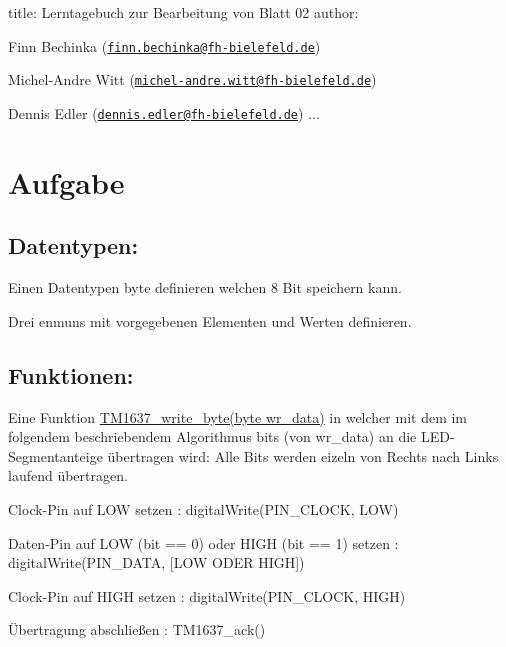 

 title\+: \textquotesingle{}Lerntagebuch zur Bearbeitung von Blatt 02\textquotesingle{} author\+:
\begin{DoxyItemize}
\item Finn Bechinka (\href{mailto:finn.bechinka@fh-bielefeld.de}{\tt finn.\+bechinka@fh-\/bielefeld.\+de})
\item Michel-\/\+Andre Witt (\href{mailto:michel-andre.witt@fh-bielefeld.de}{\tt michel-\/andre.\+witt@fh-\/bielefeld.\+de})
\item Dennis Edler (\href{mailto:dennis.edler@fh-bielefeld.de}{\tt dennis.\+edler@fh-\/bielefeld.\+de}) ...
\end{DoxyItemize}\hypertarget{md_lerntagebuch_autotoc_md0}{}\section{Aufgabe}\label{md_lerntagebuch_autotoc_md0}
\hypertarget{md_lerntagebuch_autotoc_md1}{}\subsection{Datentypen\+:}\label{md_lerntagebuch_autotoc_md1}

\begin{DoxyEnumerate}
\item Einen Datentypen byte definieren welchen 8 Bit speichern kann.
\item Drei enmuns mit vorgegebenen Elementen und Werten definieren.
\end{DoxyEnumerate}\hypertarget{md_lerntagebuch_autotoc_md2}{}\subsection{Funktionen\+:}\label{md_lerntagebuch_autotoc_md2}
Eine Funktion {\ttfamily \hyperlink{segmentanzeige_8c_a09f1e0171b38b9abbb5d351364cfec71}{T\+M1637\+\_\+write\+\_\+byte(byte wr\+\_\+data)}} in welcher mit dem im folgendem beschriebendem Algorithmus bits (von wr\+\_\+data) an die L\+E\+D-\/\+Segmentanteige übertragen wird\+: Alle Bits werden eizeln von Rechts nach Links laufend übertragen.


\begin{DoxyEnumerate}
\item Clock-\/\+Pin auf L\+OW setzen \+: {\ttfamily digital\+Write(\+P\+I\+N\+\_\+\+C\+L\+O\+C\+K, L\+O\+W)}
\item Daten-\/\+Pin auf L\+OW (bit == 0) oder H\+I\+GH (bit == 1) setzen \+: {\ttfamily digital\+Write(\+P\+I\+N\+\_\+\+D\+A\+T\+A, \mbox{[}\+L\+O\+W O\+D\+E\+R H\+I\+G\+H\mbox{]})}
\item Clock-\/\+Pin auf H\+I\+GH setzen \+: {\ttfamily digital\+Write(\+P\+I\+N\+\_\+\+C\+L\+O\+C\+K, H\+I\+G\+H)}
\item Übertragung abschließen \+: {\ttfamily T\+M1637\+\_\+ack()}
\end{DoxyEnumerate}

